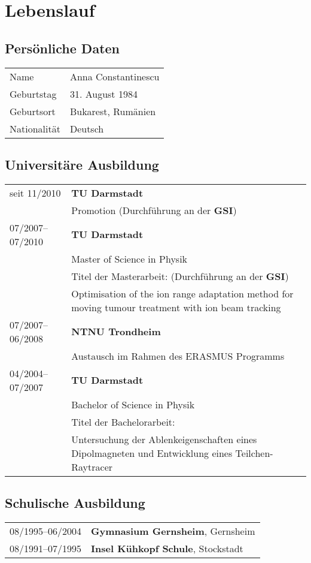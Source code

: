 \documentclass[type=dr, dr=rernat, accentcolor=tud7b,colorbacktitle, bigchapter, openright, twoside, 12pt ]{tudthesis}
\begin{document}
\newpage
\chapter*{Lebenslauf}

\section*{Pers\"onliche Daten}
\begin{tabular}{p{}p{}}
  \hfill Name & Anna Constantinescu\\
  \hfill Geburtstag & 31. August 1984\\
  \hfill Geburtsort & Bukarest, Rum\"anien\\
  \hfill Nationalit\"at & Deutsch\\
\end{tabular}

\section*{Universit\"are Ausbildung}
\begin{tabular}{p{}p{}}
  \hfill seit 11/2010 & \textbf{TU Darmstadt} \\
  & Promotion (Durchf\"uhrung an der \textbf{GSI})\\
  \hfill 07/2007--07/2010 & \textbf{TU Darmstadt}\\
  & Master of Science in Physik\\
  & Titel der Masterarbeit: (Durchf\"uhrung an der \textbf{GSI})\\
  & Optimisation of the ion range adaptation method for moving tumour treatment with ion beam tracking \\
  \hfill 07/2007--06/2008 & \textbf{NTNU Trondheim}\\
  & Austausch im Rahmen des ERASMUS Programms\\
  \hfill 04/2004--07/2007 & \textbf{TU Darmstadt}\\
  & Bachelor of Science in Physik\\
  & Titel der Bachelorarbeit:\\
  & Untersuchung der Ablenkeigenschaften eines Dipolmagneten und Entwicklung eines Teilchen-Raytracer \\
\end{tabular}

\section*{Schulische Ausbildung}
\begin{tabular}{p{}p{}}
  \hfill 08/1995--06/2004 & \textbf{Gymnasium Gernsheim}, Gernsheim\\
  \hfill 08/1991--07/1995 & \textbf{Insel K\"uhkopf Schule}, Stockstadt\\
\end{tabular}
\end{document}
